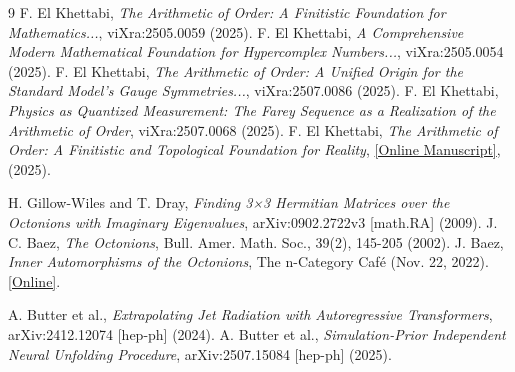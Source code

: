 \documentclass[11pt, a4paper]{article}
\theoremstyle{definition}
\theoremstyle{remark}
\begin{document}
\begin{thebibliography}{9}
     F. El Khettabi, \textit{The Arithmetic of Order: A Finitistic Foundation for Mathematics...}, viXra:2505.0059 (2025).
     F. El Khettabi, \textit{A Comprehensive Modern Mathematical Foundation for Hypercomplex Numbers...}, viXra:2505.0054 (2025).
     F. El Khettabi, \textit{The Arithmetic of Order: A Unified Origin for the Standard Model’s Gauge Symmetries...}, viXra:2507.0086 (2025).
     F. El Khettabi, \textit{Physics as Quantized Measurement: The Farey Sequence as a Realization of the Arithmetic of Order}, viXra:2507.0068 (2025).
     F. El Khettabi, \textit{The Arithmetic of Order: A Finitistic and Topological Foundation for Reality}, \href{http://efaysal.github.io/HCNFEK2024FE/Hardronaoofek_july_2025.pdf}{[Online Manuscript]}, (2025).
    
     H. Gillow-Wiles and T. Dray, \textit{Finding 3×3 Hermitian Matrices over the Octonions with Imaginary Eigenvalues}, arXiv:0902.2722v3 [math.RA] (2009).
     J. C. Baez, \textit{The Octonions}, Bull. Amer. Math. Soc., 39(2), 145-205 (2002).
     J. Baez, \textit{Inner Automorphisms of the Octonions}, The n-Category Café (Nov. 22, 2022). \href{https://golem.ph.utexas.edu/category/2022/11/inner_automorphisms_of_the_oct.html}{[Online]}.
    
     A. Butter et al., \textit{Extrapolating Jet Radiation with Autoregressive Transformers}, arXiv:2412.12074 [hep-ph] (2024).
     A. Butter et al., \textit{Simulation-Prior Independent Neural Unfolding Procedure}, arXiv:2507.15084 [hep-ph] (2025).
\end{thebibliography}
\end{document}

